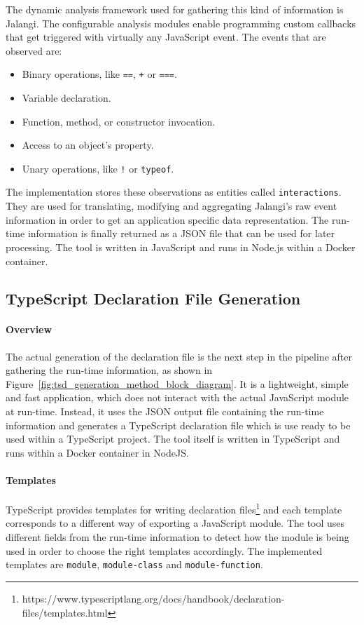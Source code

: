 \documentclass[a4paper,english,cleveref, autoref]{lipics-v2019}
\newcommand{\figref}[1]{Figure~\ref{#1}}
\begin{document}
The dynamic analysis framework used for gathering this kind of information is Jalangi. The configurable analysis modules enable programming custom callbacks that get triggered with virtually any JavaScript event. The events that are observed are:
\begin{itemize}
  \item Binary operations, like \lstinline{==}, \lstinline{+} or \lstinline{===}.
  \item Variable declaration.
  \item Function, method, or constructor invocation.
  \item Access to an object's property.
  \item Unary operations, like \lstinline{!} or \lstinline{typeof}.
\end{itemize}

The implementation stores these observations as entities called \lstinline{interactions}. They are used for translating, modifying and aggregating Jalangi's raw event information in order to get an application specific data representation. The run-time information is finally returned as a JSON file that can be used for later processing. The tool is written in JavaScript and runs in Node.js within a Docker container.

\subsection{TypeScript Declaration File Generation}
\paragraph*{Overview}
The actual generation of the declaration file is the next step in the pipeline after gathering the run-time information, as shown in \figref{fig:tsd_generation_method_block_diagram}. It is a lightweight, simple and fast application, which does not interact with the actual JavaScript module at run-time. Instead, it uses the JSON output file containing the run-time information and generates a TypeScript declaration file which is use ready to be used within a TypeScript project. The tool itself is written in TypeScript and runs within a Docker container in NodeJS. 

\paragraph*{Templates}
TypeScript provides templates for writing declaration files\footnote{https://www.typescriptlang.org/docs/handbook/declaration-files/templates.html} and each template corresponds to a different way of exporting a JavaScript module. The tool uses different fields from the run-time information to detect how the module is being used in order to choose the right templates accordingly. The implemented templates are \lstinline{module}, \lstinline{module-class} and \lstinline{module-function}.
\end{document}
